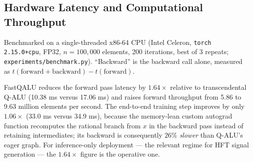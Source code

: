 \documentclass[conference]{IEEEtran}
\begin{document}
\subsection{Hardware Latency and Computational Throughput}
Benchmarked on a single-threaded x86-64 CPU (Intel Celeron, \texttt{torch 2.15.0+cpu}, FP32, $n = 100{,}000$ elements, 200 iterations, best of 3 repeats; \texttt{experiments/benchmark.py}). ``Backward'' is the backward call alone, measured as $t(\text{forward}+\text{backward}) - t(\text{forward})$.

\begin{table}[htbp]
\caption{Computational Throughput Benchmark (100,000 FP32 Elements, Single Thread)}
\label{tab:throughput}
\centering
\setlength{\tabcolsep}{3pt}
\end{table}
\vspace{1em}

FastQALU reduces the forward pass latency by $\mathbf{1.64\times}$ relative to transcendental Q-ALU (10.38 ms versus 17.06 ms) and raises forward throughput from 5.86 to 9.63 million elements per second. The end-to-end training step improves by only $1.06\times$ (33.0 ms versus 34.9 ms), because the memory-lean custom autograd function recomputes the rational branch from $x$ in the backward pass instead of retaining intermediates; its backward is consequently $26\%$ \emph{slower} than Q-ALU's eager graph. For inference-only deployment --- the relevant regime for HFT signal generation --- the $1.64\times$ figure is the operative one.
\end{document}
